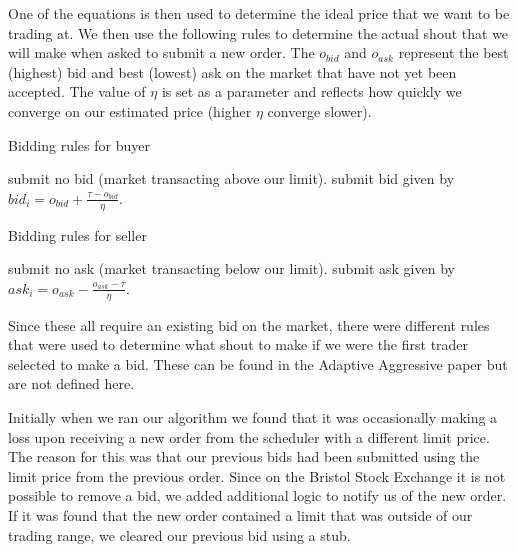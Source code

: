 \documentclass[preprint]{acm_proc_article-sp} %
\begin{document}

One of the equations is then used to determine the ideal price that we want to
be trading at. We then use the following rules to determine the actual shout
that we will make when asked to submit a new order. The $o_{bid}$ and $o_{ask}$
represent the best (highest) bid and best (lowest) ask on the market that have
not yet been accepted. The value of $\eta$ is set as a parameter and reflects
how quickly we converge on our estimated price (higher $\eta$ converge slower).

\begin{algorithm}[H]
    \caption{Bidding rules for buyer}
    \begin{algorithmic}
            \STATE submit no bid (market transacting above our limit).
        \ELSE
            \STATE submit bid given by $bid_i = \textstyle o_{bid} + \frac{\textstyle \tau - o_{bid}}{\textstyle \eta}$.
        \ENDIF
    \end{algorithmic}
    \label{alg:bidding_rules_buyer}
\end{algorithm}

\begin{algorithm}[H]
    \caption{Bidding rules for seller}
    \begin{algorithmic}
            \STATE submit no ask (market transacting below our limit).
        \ELSE
            \STATE submit ask given by $ask_i = \textstyle o_{ask} - \frac{\textstyle o_{ask}-\tau}{\textstyle \eta}$.
        \ENDIF
    \end{algorithmic}
    \label{alg:bidding_rules_seller}
\end{algorithm}

Since these all require an existing bid on the market, there were different
rules that were used to determine what shout to make if we were the first
trader selected to make a bid. These can be found in the Adaptive Aggressive
paper \cite[p.~32]{AA_paper} but are not defined here.

Initially when we ran our algorithm we found that it was occasionally making a
loss upon receiving a new order from the scheduler with a different limit
price. The reason for this was that our previous bids had been submitted using
the limit price from the previous order. Since on the Bristol Stock Exchange it
is not possible to remove a bid, we added additional logic to notify us of the
new order. If it was found that the new order contained a limit that was
outside of our trading range, we cleared our previous bid using a stub.\\
\end{document}
